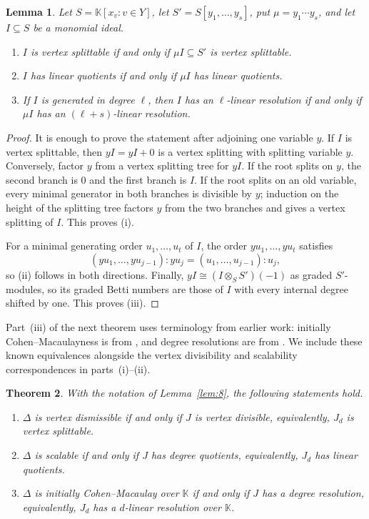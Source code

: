 \documentclass[11pt]{amsart}
\newcommand{\K}{\mathbb K}
\newtheorem{theorem}{Theorem}[section]
\newtheorem{lemma}[theorem]{Lemma}
\theoremstyle{definition}
\begin{document}
	\begin{lemma}\label{lem:9}
		Let $S=\K[x_v:v\in Y]$, let $S'=S[y_1,\ldots,y_s]$, put $\mu=y_1\cdots y_s$, and let $I\subseteq S$ be a monomial ideal.
		\begin{enumerate}[label=\textup{(\roman*)}]
			\item $I$ is vertex splittable if and only if $\mu I\subseteq S'$ is vertex splittable.
			\item $I$ has linear quotients if and only if $\mu I$ has linear quotients.
			\item If $I$ is generated in degree $\ell$, then $I$ has an $\ell$-linear resolution if and only if $\mu I$ has an $(\ell+s)$-linear resolution.
		\end{enumerate}
	\end{lemma}
	
	\begin{proof}
		It is enough to prove the statement after adjoining one variable $y$.  If $I$ is vertex splittable, then $yI=yI+0$ is a vertex splitting with splitting variable $y$.  Conversely, factor $y$ from a vertex splitting tree for $yI$.  If the root splits on $y$, the second branch is $0$ and the first branch is $I$.  If the root splits on an old variable, every minimal generator in both branches is divisible by $y$; induction on the height of the splitting tree factors $y$ from the two branches and gives a vertex splitting of $I$.  This proves (i).
		
		For a minimal generating order $u_1,\ldots,u_t$ of $I$, the order $yu_1,\ldots,yu_t$ satisfies
		\[
		(yu_1,\ldots,yu_{j-1}):yu_j
		=(u_1,\ldots,u_{j-1}):u_j,
		\]
		so (ii) follows in both directions.  Finally, $yI\cong (I\otimes_S S')(-1)$ as graded $S'$-modules, so its graded Betti numbers are those of $I$ with every internal degree shifted by one.  This proves (iii).
	\end{proof}
	
	Part~(iii) of the next theorem uses terminology from earlier work: initially Cohen--Macaulayness is from \cite{Namiq2026ICM}, and degree resolutions are from \cite{Namiq2026Skeletons}. We include these known equivalences alongside the vertex divisibility and scalability correspondences in parts~(i)--(ii).
	
	\begin{theorem}\label{thm:7}
		With the notation of Lemma~\ref{lem:8}, the following statements hold.
		\begin{enumerate}[label=\textup{(\roman*)}]
			\item $\Delta$ is vertex dismissible if and only if $J$ is vertex divisible, equivalently, $J_d$ is vertex splittable.
			\item $\Delta$ is scalable if and only if $J$ has degree quotients, equivalently, $J_d$ has linear quotients.
			\item $\Delta$ is initially Cohen--Macaulay over $\K$ if and only if $J$ has a degree resolution, equivalently, $J_d$ has a $d$-linear resolution over $\K$.
		\end{enumerate}
	\end{theorem}
	
\end{document}
